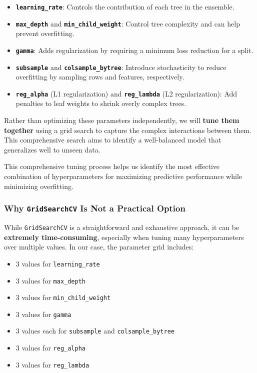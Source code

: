 \documentclass[
  letterpaper,
  DIV=11,
  numbers=noendperiod]{scrreprt}
\providecommand{\tightlist}{%
  \setlength{\itemsep}{0pt}\setlength{\parskip}{0pt}}\usepackage{longtable,booktabs,array}
\begin{document}
\begin{itemize}
\tightlist
\item
  \textbf{\texttt{learning\_rate}}: Controls the contribution of each
  tree in the ensemble.
\item
  \textbf{\texttt{max\_depth}} and \textbf{\texttt{min\_child\_weight}}:
  Control tree complexity and can help prevent overfitting.
\item
  \textbf{\texttt{gamma}}: Adds regularization by requiring a minimum
  loss reduction for a split.
\item
  \textbf{\texttt{subsample}} and \textbf{\texttt{colsample\_bytree}}:
  Introduce stochasticity to reduce overfitting by sampling rows and
  features, respectively.
\item
  \textbf{\texttt{reg\_alpha}} (L1 regularization) and
  \textbf{\texttt{reg\_lambda}} (L2 regularization): Add penalties to
  leaf weights to shrink overly complex trees.
\end{itemize}

Rather than optimizing these parameters independently, we will
\textbf{tune them together} using a grid search to capture the complex
interactions between them. This comprehensive search aims to identify a
well-balanced model that generalizes well to unseen data.

This comprehensive tuning process helps us identify the most effective
combination of hyperparameters for maximizing predictive performance
while minimizing overfitting.

\subsubsection{\texorpdfstring{Why \texttt{GridSearchCV} Is Not a
Practical
Option}{Why GridSearchCV Is Not a Practical Option}}\label{why-gridsearchcv-is-not-a-practical-option}

While \texttt{GridSearchCV} is a straightforward and exhaustive
approach, it can be \textbf{extremely time-consuming}, especially when
tuning many hyperparameters over multiple values. In our case, the
parameter grid includes:

\begin{itemize}
\tightlist
\item
  3 values for \texttt{learning\_rate}
\item
  3 values for \texttt{max\_depth}
\item
  3 values for \texttt{min\_child\_weight}
\item
  3 values for \texttt{gamma}
\item
  3 values each for \texttt{subsample} and \texttt{colsample\_bytree}
\item
  3 values for \texttt{reg\_alpha}
\item
  3 values for \texttt{reg\_lambda}
\end{itemize}
\end{document}
